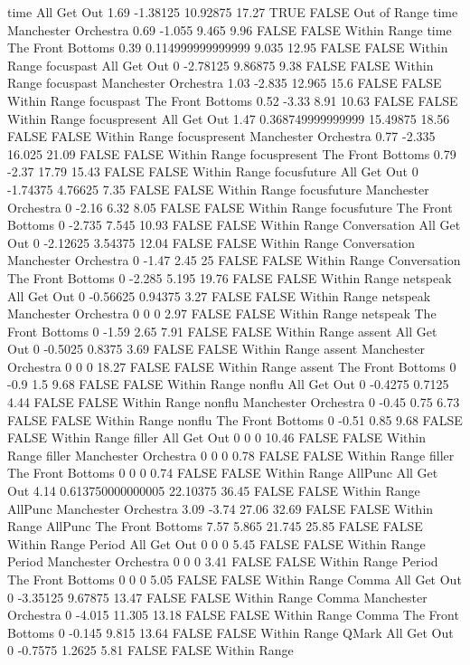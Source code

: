 time All Get Out 1.69 -1.38125 10.92875 17.27 TRUE FALSE Out of Range
time Manchester Orchestra 0.69 -1.055 9.465 9.96 FALSE FALSE Within Range
time The Front Bottoms 0.39 0.114999999999999 9.035 12.95 FALSE FALSE Within Range
focuspast All Get Out 0 -2.78125 9.86875 9.38 FALSE FALSE Within Range
focuspast Manchester Orchestra 1.03 -2.835 12.965 15.6 FALSE FALSE Within Range
focuspast The Front Bottoms 0.52 -3.33 8.91 10.63 FALSE FALSE Within Range
focuspresent All Get Out 1.47 0.368749999999999 15.49875 18.56 FALSE FALSE Within Range
focuspresent Manchester Orchestra 0.77 -2.335 16.025 21.09 FALSE FALSE Within Range
focuspresent The Front Bottoms 0.79 -2.37 17.79 15.43 FALSE FALSE Within Range
focusfuture All Get Out 0 -1.74375 4.76625 7.35 FALSE FALSE Within Range
focusfuture Manchester Orchestra 0 -2.16 6.32 8.05 FALSE FALSE Within Range
focusfuture The Front Bottoms 0 -2.735 7.545 10.93 FALSE FALSE Within Range
Conversation All Get Out 0 -2.12625 3.54375 12.04 FALSE FALSE Within Range
Conversation Manchester Orchestra 0 -1.47 2.45 25 FALSE FALSE Within Range
Conversation The Front Bottoms 0 -2.285 5.195 19.76 FALSE FALSE Within Range
netspeak All Get Out 0 -0.56625 0.94375 3.27 FALSE FALSE Within Range
netspeak Manchester Orchestra 0 0 0 2.97 FALSE FALSE Within Range
netspeak The Front Bottoms 0 -1.59 2.65 7.91 FALSE FALSE Within Range
assent All Get Out 0 -0.5025 0.8375 3.69 FALSE FALSE Within Range
assent Manchester Orchestra 0 0 0 18.27 FALSE FALSE Within Range
assent The Front Bottoms 0 -0.9 1.5 9.68 FALSE FALSE Within Range
nonflu All Get Out 0 -0.4275 0.7125 4.44 FALSE FALSE Within Range
nonflu Manchester Orchestra 0 -0.45 0.75 6.73 FALSE FALSE Within Range
nonflu The Front Bottoms 0 -0.51 0.85 9.68 FALSE FALSE Within Range
filler All Get Out 0 0 0 10.46 FALSE FALSE Within Range
filler Manchester Orchestra 0 0 0 0.78 FALSE FALSE Within Range
filler The Front Bottoms 0 0 0 0.74 FALSE FALSE Within Range
AllPunc All Get Out 4.14 0.613750000000005 22.10375 36.45 FALSE FALSE Within Range
AllPunc Manchester Orchestra 3.09 -3.74 27.06 32.69 FALSE FALSE Within Range
AllPunc The Front Bottoms 7.57 5.865 21.745 25.85 FALSE FALSE Within Range
Period All Get Out 0 0 0 5.45 FALSE FALSE Within Range
Period Manchester Orchestra 0 0 0 3.41 FALSE FALSE Within Range
Period The Front Bottoms 0 0 0 5.05 FALSE FALSE Within Range
Comma All Get Out 0 -3.35125 9.67875 13.47 FALSE FALSE Within Range
Comma Manchester Orchestra 0 -4.015 11.305 13.18 FALSE FALSE Within Range
Comma The Front Bottoms 0 -0.145 9.815 13.64 FALSE FALSE Within Range
QMark All Get Out 0 -0.7575 1.2625 5.81 FALSE FALSE Within Range
